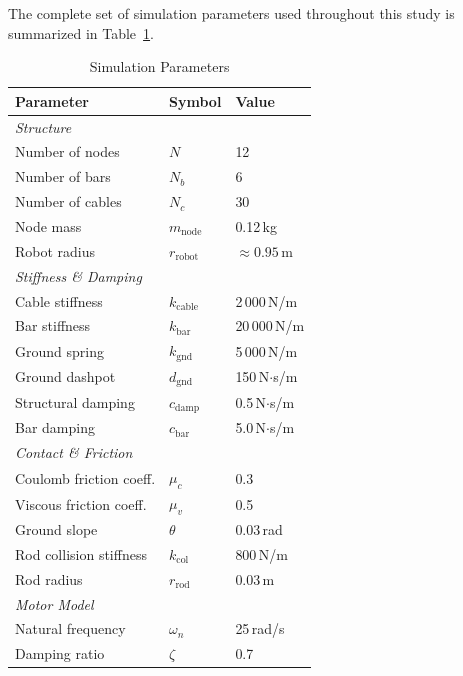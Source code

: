 \documentclass[conference]{IEEEtran}
\begin{document}
The complete set of simulation parameters used throughout this study is
summarized in Table~\ref{tab:sim_params}.

\begin{table}[htbp]
\centering
\caption{Simulation Parameters}
\label{tab:sim_params}
\begin{tabular}{l l l}
\hline
\textbf{Parameter} & \textbf{Symbol} & \textbf{Value} \\
\hline
\multicolumn{3}{l}{\textit{Structure}} \\
Number of nodes            & $N$              & 12 \\
Number of bars             & $N_b$            & 6 \\
Number of cables           & $N_c$            & 30 \\
Node mass                  & $m_{\mathrm{node}}$ & 0.12\,kg \\
Robot radius               & $r_{\mathrm{robot}}$ & $\approx 0.95$\,m \\
\hline
\multicolumn{3}{l}{\textit{Stiffness \& Damping}} \\
Cable stiffness            & $k_{\mathrm{cable}}$ & 2\,000\,N/m \\
Bar stiffness              & $k_{\mathrm{bar}}$   & 20\,000\,N/m \\
Ground spring              & $k_{\mathrm{gnd}}$   & 5\,000\,N/m \\
Ground dashpot             & $d_{\mathrm{gnd}}$   & 150\,N$\cdot$s/m \\
Structural damping         & $c_{\mathrm{damp}}$  & 0.5\,N$\cdot$s/m \\
Bar damping                & $c_{\mathrm{bar}}$   & 5.0\,N$\cdot$s/m \\
\hline
\multicolumn{3}{l}{\textit{Contact \& Friction}} \\
Coulomb friction coeff.    & $\mu_c$          & 0.3 \\
Viscous friction coeff.    & $\mu_v$          & 0.5 \\
Ground slope               & $\theta$         & 0.03\,rad \\
Rod collision stiffness    & $k_{\mathrm{col}}$ & 800\,N/m \\
Rod radius                 & $r_{\mathrm{rod}}$ & 0.03\,m \\
\hline
\multicolumn{3}{l}{\textit{Motor Model}} \\
Natural frequency          & $\omega_n$       & 25\,rad/s \\
Damping ratio              & $\zeta$          & 0.7 \\

\end{tabular}
\end{table}
\end{document}
